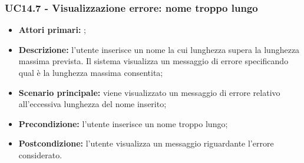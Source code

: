 \subsubsection{UC14.7 - Visualizzazione errore: nome troppo lungo}
\begin{itemize}
	\item \textbf{Attori primari:} \us{};
	\item \textbf{Descrizione:} l’utente inserisce un nome la cui lunghezza supera la lunghezza massima prevista. Il sistema visualizza un messaggio di errore specificando qual è la lunghezza massima consentita; 
	\item \textbf{Scenario principale:} viene visualizzato un messaggio di errore relativo all’eccessiva lunghezza del nome inserito;
	\item \textbf{Precondizione:} l'utente inserisce un nome troppo lungo;
	\item \textbf{Postcondizione:} l’utente visualizza un messaggio riguardante l’errore considerato. 
\end{itemize}